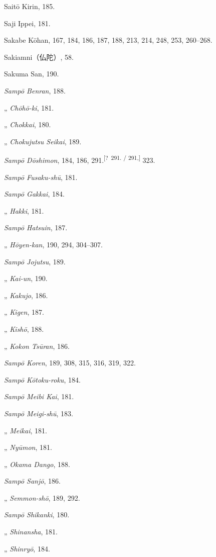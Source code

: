 \documentclass[11pt]{article}
\newcommand{\unclear}[1]{\textsuperscript{[?~#1]}}
\begin{document}
Saitō Kirin, 185.\par
Saji Ippei, 181.\par
Sakabe Kōhan, 167, 184, 186, 187, 188, 213, 214, 248, 253, 260--268.\par
Sakiamni（仏陀）, 58.\par
Sakuma San, 190.\par
\emph{Sampō Benran}, 188.\par
\quad „ \emph{Chōhō-ki}, 181.\par
\quad „ \emph{Chokkai}, 180.\par
\quad „ \emph{Chokujutsu Seikai}, 189.\par
\emph{Sampō Dōshimon}, 184, 186, 291.\unclear{291. / 291,} 323.\par
\emph{Sampō Fusaku-shū}, 181.\par
\emph{Sampō Gakkai}, 184.\par
\quad „ \emph{Hakki}, 181.\par
\emph{Sampō Hatsuin}, 187.\par
\quad „ \emph{Hōyen-kan}, 190, 294, 304--307.\par
\emph{Sampō Jojutsu}, 189.\par
\quad „ \emph{Kai-un}, 190.\par
\quad „ \emph{Kakujo}, 186.\par
\quad „ \emph{Kigen}, 187.\par
\quad „ \emph{Kishō}, 188.\par
\quad „ \emph{Kokon Tsūran}, 186.\par
\emph{Sampō Koren}, 189, 308, 315, 316, 319, 322.\par
\emph{Sampō Kōtoku-roku}, 184.\par
\emph{Sampō Meibi Kai}, 181.\par
\emph{Sampō Meigi-shū}, 183.\par
\quad „ \emph{Meikai}, 181.\par
\quad „ \emph{Nyūmon}, 181.\par
\quad „ \emph{Okama Dango}, 188.\par
\emph{Sampō Sanjō}, 186.\par
\quad „ \emph{Semmon-shō}, 189, 292.\par
\emph{Sampō Shikanki}, 180.\par
\quad „ \emph{Shinansha}, 181.\par
\quad „ \emph{Shinryō}, 184.\par
\end{document}
